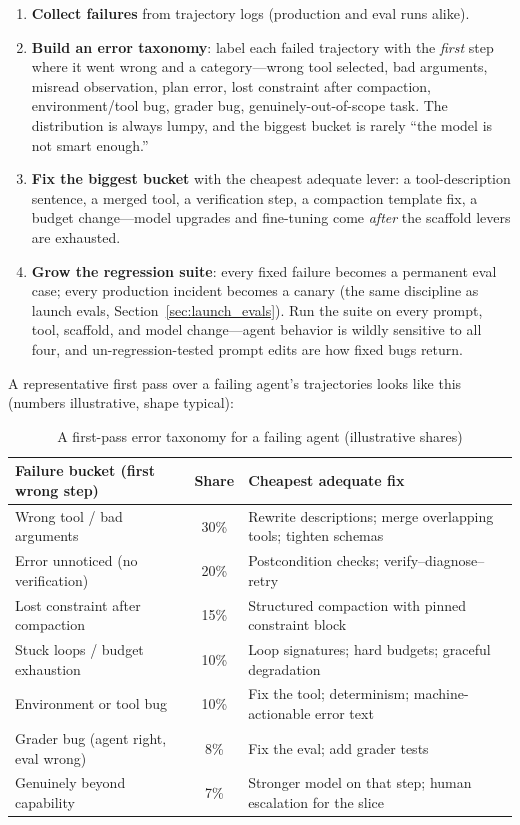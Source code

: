 \begin{enumerate}
    \item \textbf{Collect failures} from trajectory logs (production and eval runs alike).
    \item \textbf{Build an error taxonomy}: label each failed trajectory with the \textit{first} step where it went wrong and a category---wrong tool selected, bad arguments, misread observation, plan error, lost constraint after compaction, environment/tool bug, grader bug, genuinely-out-of-scope task. The distribution is always lumpy, and the biggest bucket is rarely ``the model is not smart enough.''
    \item \textbf{Fix the biggest bucket} with the cheapest adequate lever: a tool-description sentence, a merged tool, a verification step, a compaction template fix, a budget change---model upgrades and fine-tuning come \textit{after} the scaffold levers are exhausted.
    \item \textbf{Grow the regression suite}: every fixed failure becomes a permanent eval case; every production incident becomes a canary (the same discipline as launch evals, Section~\ref{sec:launch_evals}). Run the suite on every prompt, tool, scaffold, and model change---agent behavior is wildly sensitive to all four, and un-regression-tested prompt edits are how fixed bugs return.
\end{enumerate}

A representative first pass over a failing agent's trajectories looks like this (numbers illustrative, shape typical):

\begin{table}[H]
\centering
\caption{A first-pass error taxonomy for a failing agent (illustrative shares)}
\label{tab:error_taxonomy}
\begin{tabularx}{\textwidth}{p{4.6cm}cX}
\toprule
\textbf{Failure bucket (first wrong step)} & \textbf{Share} & \textbf{Cheapest adequate fix} \\
\midrule
Wrong tool / bad arguments & 30\% & Rewrite descriptions; merge overlapping tools; tighten schemas \\
Error unnoticed (no verification) & 20\% & Postcondition checks; verify--diagnose--retry \\
Lost constraint after compaction & 15\% & Structured compaction with pinned constraint block \\
Stuck loops / budget exhaustion & 10\% & Loop signatures; hard budgets; graceful degradation \\
Environment or tool bug & 10\% & Fix the tool; determinism; machine-actionable error text \\
Grader bug (agent right, eval wrong) & 8\% & Fix the eval; add grader tests \\
Genuinely beyond capability & 7\% & Stronger model on that step; human escalation for the slice \\
\bottomrule
\end{tabularx}
\end{table}

